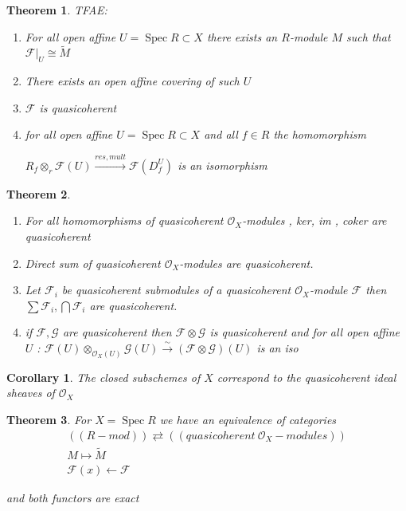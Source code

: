 \documentclass[a4paper, 12pt]{article}
\newcommand{\caf}{\mathcal{F}}
\newcommand{\cag}{\mathcal{G}}
\newcommand{\oxmod}{$\mathcal{O}_X$-module }
\newcommand{\oxmods}{$\mathcal{O}_X$-modules }
\newcommand{\ox}{\mathcal{O}_X}
\newtheorem*{thm}{Theorem}
\newtheorem*{cor}{Corollary}
\DeclareMathOperator{\spec}{Spec}
\begin{document}
	\begin{thm}
		TFAE:
		\begin{enumerate}
			\item For all open affine $ U = \spec R \subset X $ there exists an $ R $-module $ M $ such that $ \caf|_U \cong \tilde{M} $
			\item There exists an open affine covering of such $ U $
			\item $ \caf $ is quasicoherent
			\item for all open affine $ U = \spec R \subset X $ and all $ f \in R $ the homomorphism 
			
			$ R_f \otimes_r \caf(U) \xrightarrow{res, mult} \caf(D^U_f) $ is an isomorphism
		\end{enumerate}
	\end{thm}
	
	\begin{thm}
		\begin{enumerate}
			\item For all homomorphisms of quasicoherent \oxmods, ker, im , coker are quasicoherent
			\item Direct sum of quasicoherent \oxmods are quasicoherent.
			\item Let $ \caf_i $ be quasicoherent submodules of a quasicoherent \oxmod $ \caf $ then $ \sum \caf_i , \bigcap \caf_i  $ are quasicoherent.
			\item if $ \caf, \cag $ are quasicoherent  then $ \caf \otimes \cag $ is quasicoherent and for all open affine $ U$ : $\caf(U) \otimes_{\ox(U)} \cag(U) \xrightarrow{\sim} (\caf \otimes \cag)(U) $ is an iso
		\end{enumerate}
	\end{thm}
	
	\begin{cor}
		The closed subschemes of $ X $ correspond to the quasicoherent  ideal sheaves of $ \ox $ 
	\end{cor}
	
	\begin{thm}
		For $ X= \spec R $ we have an equivalence of categories
		\begin{gather*}
			((R-mod)) \rightleftarrows ((quasicoherent \ \ox -modules))\\
			M \longmapsto \tilde{M}\\
			\caf(x) \longleftarrow \caf
		\end{gather*}
	
	and both functors are exact	
	\end{thm}
	
\end{document}
